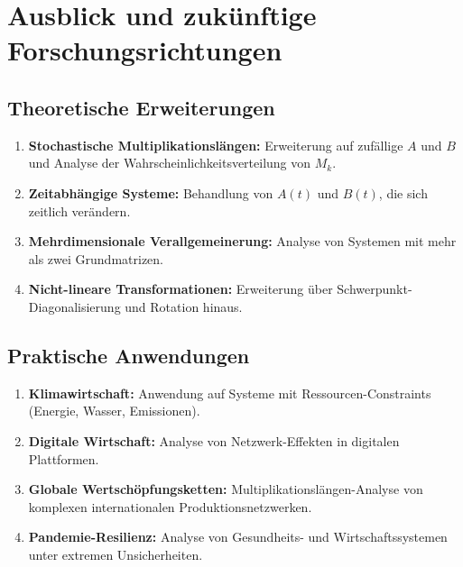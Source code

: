 \documentclass[a4paper,12pt]{article}
\theoremstyle{definition}
\begin{document}
\section{Ausblick und zukünftige Forschungsrichtungen}

\subsection{Theoretische Erweiterungen}

\begin{enumerate}

\item \textbf{Stochastische Multiplikationslängen:} Erweiterung auf zufällige $A$ und $B$ und Analyse der Wahrscheinlichkeitsverteilung von $M_k$.

\item \textbf{Zeitabhängige Systeme:} Behandlung von $A(t)$ und $B(t)$, die sich zeitlich verändern.

\item \textbf{Mehrdimensionale Verallgemeinerung:} Analyse von Systemen mit mehr als zwei Grundmatrizen.

\item \textbf{Nicht-lineare Transformationen:} Erweiterung über Schwerpunkt-Diagonalisierung und Rotation hinaus.

\end{enumerate}

\subsection{Praktische Anwendungen}

\begin{enumerate}

\item \textbf{Klimawirtschaft:} Anwendung auf Systeme mit Ressourcen-Constraints (Energie, Wasser, Emissionen).

\item \textbf{Digitale Wirtschaft:} Analyse von Netzwerk-Effekten in digitalen Plattformen.

\item \textbf{Globale Wertschöpfungsketten:} Multiplikationslängen-Analyse von komplexen internationalen Produktionsnetzwerken.

\item \textbf{Pandemie-Resilienz:} Analyse von Gesundheits- und Wirtschaftssystemen unter extremen Unsicherheiten.

\end{enumerate}
\end{document}
